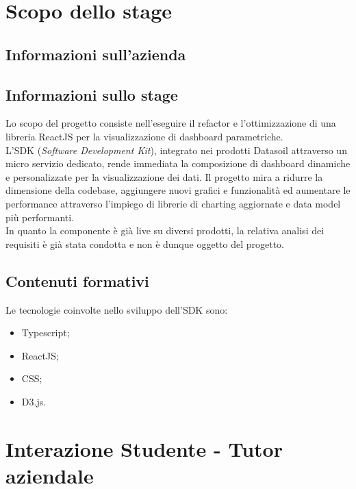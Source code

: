 \documentclass[a4paper, 12pt]{article}
\begin{document}
\clearpage

\section{Scopo dello stage}

\subsection{Informazioni sull'azienda}


\subsection{Informazioni sullo stage}

Lo scopo del progetto consiste nell'eseguire il refactor e l’ottimizzazione di una libreria ReactJS per la visualizzazione di dashboard parametriche. \\
L’SDK (\textit{Software Development Kit}), integrato nei prodotti Datasoil attraverso un micro servizio dedicato, rende immediata la composizione di dashboard dinamiche e personalizzate 
per la visualizzazione dei dati. Il progetto mira a ridurre la dimensione della codebase, aggiungere nuovi grafici e funzionalità ed aumentare le 
performance attraverso l’impiego di librerie di charting aggiornate e data model più performanti. \\
In quanto la componente è già live su diversi prodotti, la relativa analisi dei requisiti è già stata condotta e non è dunque oggetto del progetto.

\subsection{Contenuti formativi}
Le tecnologie coinvolte nello sviluppo dell'SDK sono:
\begin{itemize}
    \item Typescript;
    \item ReactJS;
    \item CSS;
    \item D3.js.
\end{itemize}

\newpage
\section{Interazione Studente - Tutor aziendale}

\end{document}
